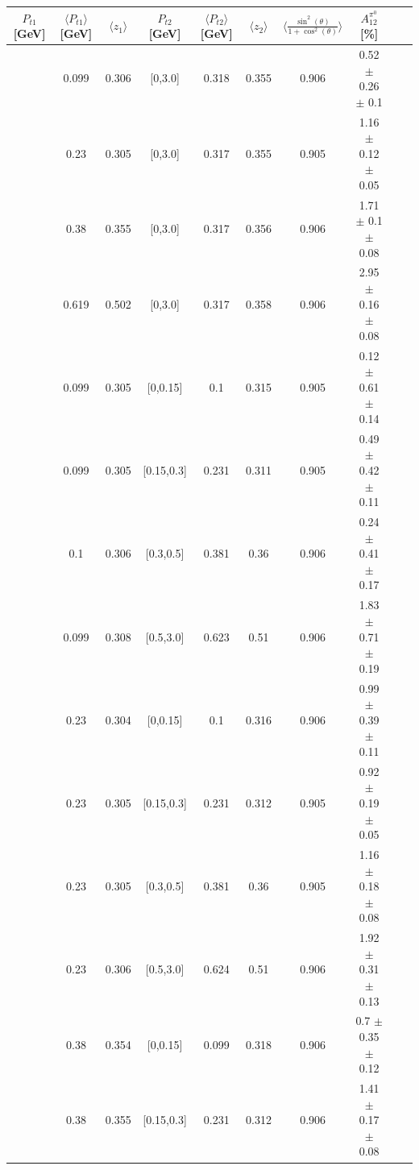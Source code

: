 \begin{table}[H]\tiny
\centering
\begin{tabular}{|c| c| c| c| c| c| c| c| c| c|}
\hline
$P_{t1}$   [GeV] & $\langle  P_{t1}  \rangle$ [GeV] & $\langle  z_1 \rangle$& $P_{t2}$  [GeV] & $\langle  P_{t2}\rangle$  [GeV] &  $\langle  z_2 \rangle$  &$\langle\frac{\sin^2(\theta)}{1+\cos^2(\theta)}\rangle$&  $A_{12}^{\pi^0}$ [\%]  \\ \hline
[0,0.15]	&	0.099	&	0.306	&	[0,3.0]	&	0.318	&	0.355	&	0.906	&     0.52  $\pm$ 0.26  $\pm$ 0.1 	\\ \hline
[0.15,0.3]	&	0.23	        &	0.305	&	[0,3.0]	&	0.317	&	0.355	&	0.905  &1.16  $\pm$ 0.12  $\pm$ 0.05 	\\ \hline
[0.3,0.5]	&	0.38	        &	0.355	&	[0,3.0]	&	0.317	&	0.356	&	0.906 & 1.71  $\pm$ 0.1  $\pm$ 0.08   	\\ \hline
[0.5,3.0]	&	0.619	&	0.502	&	[0,3.0]	&	0.317	&	0.358	&	0.906	&     2.95  $\pm$ 0.16  $\pm$ 0.08 	\\ \hline
\hline
[0,0.15]	&	0.099	&	0.305	&	[0,0.15]	&	0.1	        &	0.315	&	0.905	&0.12  $\pm$ 0.61  $\pm$ 0.14  	\\ \hline
[0,0.15]	&	0.099	&	0.305	&	[0.15,0.3]	&	0.231	&	0.311	&	0.905   	&0.49  $\pm$ 0.42  $\pm$ 0.11  	\\ \hline
[0,0.15]	&	0.1	        &	0.306	&	[0.3,0.5]	&	0.381	&	0.36	         &0.906       &0.24  $\pm$ 0.41  $\pm$ 0.17       	\\ \hline
[0,0.15]	&	0.099	&	0.308	&	[0.5,3.0]	&	0.623	&	0.51	        &	0.906	&1.83  $\pm$ 0.71  $\pm$ 0.19  		\\ \hline
\hline
[0.15,0.3]	&	0.23	        &	0.304	&	[0,0.15]	&	0.1	        &	0.316	&0.906        &0.99  $\pm$ 0.39  $\pm$ 0.11  	\\ \hline
[0.15,0.3]	&	0.23	        &	0.305	&	[0.15,0.3]	&	0.231	&	0.312	&	0.905	&0.92  $\pm$ 0.19  $\pm$ 0.05  		\\ \hline
[0.15,0.3]	&	0.23	        &	0.305	&	[0.3,0.5]	&	0.381	&	0.36	        &0.905	&1.16  $\pm$ 0.18  $\pm$ 0.08  	\\ \hline
[0.15,0.3]	&	0.23	        &	0.306	&	[0.5,3.0]	&	0.624	&	0.51	        & 0.906	& 1.92  $\pm$ 0.31  $\pm$ 0.13 	\\ \hline
\hline
[0.3,0.5]	&	0.38	        &	0.354	&	[0,0.15]	&	0.099	&	0.318	&	0.906	&0.7  $\pm$ 0.35  $\pm$ 0.12   		\\ \hline
[0.3,0.5]	&	0.38	        &	0.355	&	[0.15,0.3]	&	0.231	&	0.312	&	0.906	&1.41  $\pm$ 0.17  $\pm$ 0.08  	\\ \hline

\end{tabular}
\end{table}
